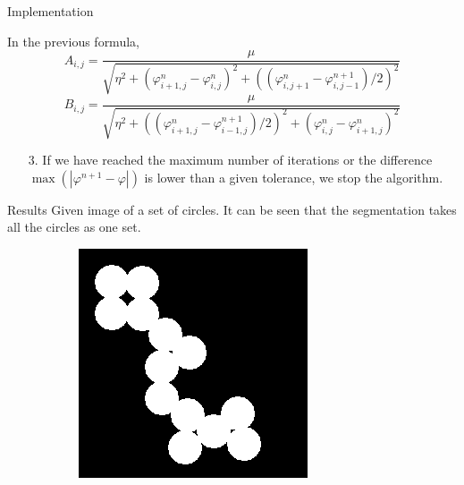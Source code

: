\documentclass[11pt]{beamer}
\begin{document}
\begin{frame}{Implementation}

In the previous formula,
$$A_{i,j} = \frac{\mu}{\sqrt{\eta^2 + (\varphi_{i+1,j}^n-\varphi_{i,j}^n)^2+((\varphi_{i,j+1}^n-\varphi_{i,j-1}^{n+1})/2)^2}}$$
$$B_{i,j} = \frac{\mu}{\sqrt{\eta^2+((\varphi_{i+1,j}^n-\varphi_{i-1,j}^{n+1})/2)^2 + (\varphi_{i,j}^n-\varphi_{i+1,j}^n)^2}}$$
\begin{itemize}
\item [3.] If we have reached the maximum number of iterations or the difference $\max(|\varphi^{n+1}-\varphi|)$ is lower than a given tolerance, we stop the algorithm.
\end{itemize}
\end{frame}

\begin{frame}{Results}
Given image of a set of circles. It can be seen that the segmentation takes all the circles as one set.


\begin{figure}
    \centering
    \begin{subfigure}[b]{0.36\textwidth}
        \includegraphics[width=\textwidth]{circles}


\end{subfigure}
\end{figure}
\end{frame}
\end{document}
